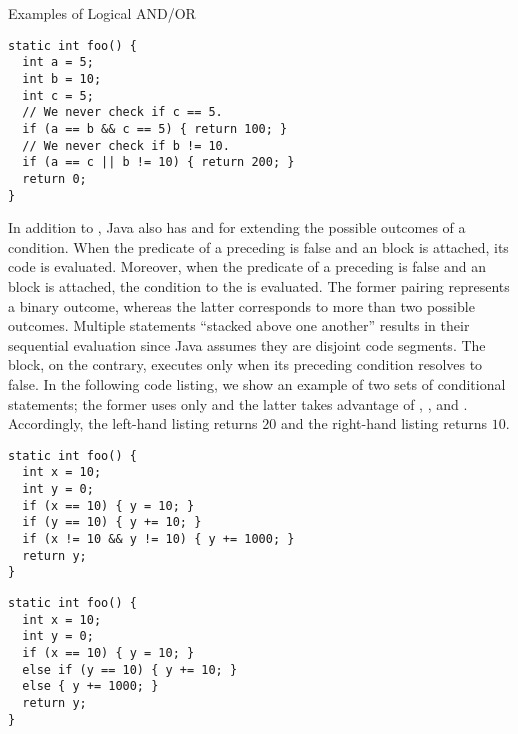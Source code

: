 \begin{cl}[]{Examples of Logical AND/OR}
\begin{lstlisting}[language=MyJava]
static int foo() {
  int a = 5;
  int b = 10;
  int c = 5;
  // We never check if c == 5.
  if (a == b && c == 5) { return 100; }
  // We never check if b != 10.
  if (a == c || b != 10) { return 200; }
  return 0;
}
\end{lstlisting}
\end{cl}

In addition to , Java also has  and  for extending the possible outcomes of a condition. When the predicate of a preceding  is false and an  block is attached, its code is evaluated. Moreover, when the predicate of a preceding  is false and an  block is attached, the condition to the  is evaluated. The former pairing represents a binary outcome, whereas the latter corresponds to more than two possible outcomes. Multiple  statements ``stacked above one another'' results in their sequential evaluation since Java assumes they are disjoint code segments. The  block, on the contrary, executes only when its preceding  condition resolves to false. In the following code listing, we show an example of two sets of conditional statements; the former uses only  and the latter takes advantage of , , and . Accordingly, the left-hand listing returns $20$ and the right-hand listing returns $10$.

\begin{clrr}[]{}
\begin{lstlisting}[language=MyJava]
static int foo() {
  int x = 10;
  int y = 0;
  if (x == 10) { y = 10; } 
  if (y == 10) { y += 10; }
  if (x != 10 && y != 10) { y += 1000; }
  return y;
}
\end{lstlisting}
\tcblower
\begin{lstlisting}[language=MyJavaNLN]
static int foo() {
  int x = 10;
  int y = 0;
  if (x == 10) { y = 10; } 
  else if (y == 10) { y += 10; } 
  else { y += 1000; }
  return y;
}
\end{lstlisting}
\end{clrr}

